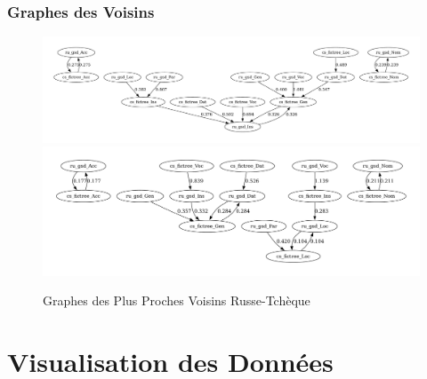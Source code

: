 \documentclass[noamsthm]{beamercours}
\begin{document}
\begin{frame}
	\frametitle{Graphes des Voisins}
	\begin{figure}
		\centering
		\includegraphics[width=\textwidth, height=.3\paperheight]{Figures/GNN/gnn_ru_gsd_cs_fictree}
		\includegraphics[width=\textwidth, height=.3\paperheight]{Figures/GNN/gnn_ru_gsd_cs_fictree_Nouns_Only}
		\caption{Graphes des Plus Proches Voisins Russe-Tchèque}
		\label{fig_gnn_nouns_ru_cz}
	\end{figure}
\end{frame}


\section{Visualisation des Données}\label{subsec:vis}
\end{document}
